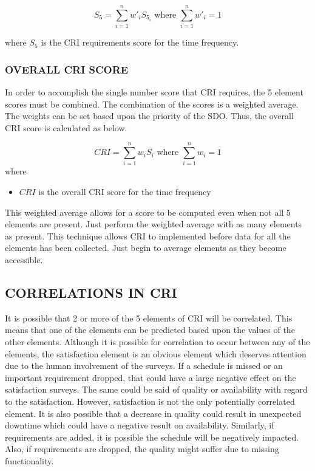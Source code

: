 \documentclass[SDSUThesis.tex]{subfiles}
\begin{document}
                \[
                    S_{5} = \sum\limits^n_{i=1} w'_i S_{5_i} \text{ where }
                        \sum\limits^n_{i=1} w'_i = 1
                \]
                
                where $S_5$ is the CRI requirements score for the time frequency.
            

        \subsubsection{OVERALL CRI SCORE}
            In order to accomplish the single number score that CRI requires,
            the 5 element scores must be combined. The combination of the scores
            is a weighted average.  The weights can be set based upon the 
            priority of the SDO.  Thus, the overall CRI score is calculated as below.
            
            \[
                CRI =\sum\limits^n_{i=1} w_i S_i 
                    \text{ where } \sum\limits^n_{i=1} w_i = 1
            \]
            where
            \begin{itemize}
                \item $CRI$ is the overall CRI score for the time frequency
            \end{itemize}
            
            This weighted average allows for a score to be computed even when not
            all 5 elements are present. Just perform the weighted average with
            as many elements as present.  This technique allows CRI to implemented
            before data for all the elements has been collected.  Just begin
            to average elements as they become accessible.


    \subsection{CORRELATIONS IN CRI}
        It is possible that 2 or more of the 5 elements of CRI will be correlated.  This means that
        one of the elements can be predicted based upon the values of the other elements.  Although
        it is possible for correlation to occur between any of the elements, the satisfaction element
        is an obvious element which deserves attention due to the human involvement of the surveys. 
        If a schedule is missed or an important requirement dropped, that could have a large negative
        effect on the satisfaction surveys.  The same could be said of quality or availability with regard to 
        the satisfaction.  However, satisfaction is not the only potentially correlated element.  It is also
        possible that a decrease in quality could result in unexpected downtime which could have a
        negative result on availability.  Similarly, if requirements are added, it is possible the schedule
        will be negatively impacted.  Also, if requirements are dropped, the quality might suffer due
        to missing functionality.  
        
\end{document}

